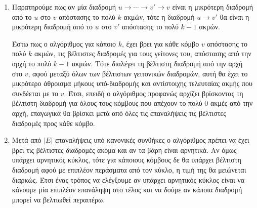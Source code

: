 \documentclass[12pt]{report}
\begin{document}
\begin{enumerate}
\item
Παρατηρούμε πως αν μία διαδρομή $u\rightarrow\cdots\rightarrow v'\rightarrow v$
είναι η μικρότερη διαδρομή από το $u$ στο $v$ απόστασης το πολύ $k$ ακμών, 
τότε η διαδρομή $u\rightarrow v'$ θα είναι η μικρότερη διαδρομή από το $u$ 
στο $v'$ απόστασης το πολύ $k-1$ ακμών. 

Έστω πως ο αλγόριθμος για κάποιο $k$, έχει βρει για κάθε κόμβο $v$ απόστασης το
πολύ $k$ ακμών, τις βέλτιστες διαδρομές για τους γείτονες του, απόστασης από την
αρχή το πολύ $k-1$ ακμών. 
Τότε διαλέγει τη βέλτιστη διαδρομή από την αρχή στο $v$, αφού μεταξύ όλων 
των βέλτιστων γειτονικών διαδρομών, αυτή θα έχει το μικρότερο άθροισμα μήκους 
υπό-διαδρομής και αντίστοιχης τελευταίας ακμής που συνδέεται με το $v$.
Έτσι, επειδή ο αλγόριθμος προφανώς αρχίζει βρίσκοντας τη βέλτιστη διαδρομή για όλους τους κόμβους που απέχουν το πολύ 0 ακμές από την αρχή, επαγωγικά θα βρίσκει
μετά από όλες τις επαναλήψεις τις βέλτιστες διαδρομές προς κάθε κόμβο.

\item
Μετά από $|E|$ επαναλήψεις υπό κανονικές συνθήκες ο αλγόριθμος πρέπει
να έχει βρει τις βέλτιστες διαδρομές ακόμα και αν τα βάρη είναι αρνητικά.
Αν όμως υπάρχει αρνητικός κύκλος, τότε για κάποιους κόμβους δε θα 
υπάρχει βέλτιστη διαδρομή αφού με επιπλέον περάσματα από τον κύκλο, η τιμή 
της θα μειώνεται διαρκώς. Έτσι ένας τρόπος να ελέγξουμε
αν υπάρχει αρνητικός κύκλος είναι να κάνουμε μία επιπλέον επανάληψη στο τέλος
και να δούμε αν κάποια διαδρομή μπορεί να βελτιωθεί περαιτέρω.
\end{enumerate}
\end{document}
